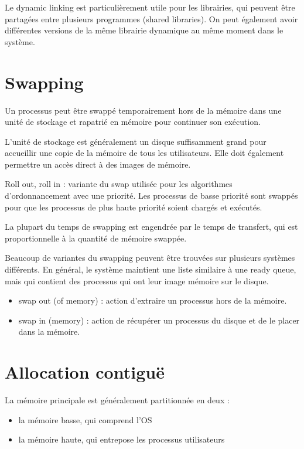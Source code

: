 	Le dynamic linking est particulièrement utile pour les librairies, qui peuvent être partagées entre plusieurs programmes (shared libraries). On peut également avoir différentes versions de la même librairie dynamique au même moment dans le système.

\section{Swapping}

Un processus peut être swappé temporairement hors de la mémoire dans une unité de stockage et rapatrié en mémoire pour continuer son exécution.

L'unité de stockage est généralement un disque suffisamment grand pour accueillir une copie de la mémoire de tous les utilisateurs. Elle doit également permettre un accès direct à des images de mémoire.

Roll out, roll in : variante du swap utilisée pour les algorithmes d'ordonnancement avec une priorité. Les processus de basse priorité sont swappés pour que les processus de plus haute priorité soient chargés et exécutés.

La plupart du temps de swapping est engendrée par le temps de transfert, qui est proportionnelle à la quantité de mémoire swappée.

Beaucoup de variantes du swapping peuvent être trouvées sur plusieurs systèmes différents. En général, le système maintient une liste similaire à une ready queue, mais qui contient des processus qui ont leur image mémoire sur le disque.

\begin{itemize}
	\item swap out (of memory) : action d'extraire un processus hors de la mémoire.
	\item swap in (memory) : action de récupérer un processus du disque et de le placer dans la mémoire.
\end{itemize}


\section{Allocation contiguë}

La mémoire principale est généralement partitionnée en deux :

\begin{itemize}
	\item la mémoire basse, qui comprend l'OS
	\item la mémoire haute, qui entrepose les processus utilisateurs
\end{itemize}

